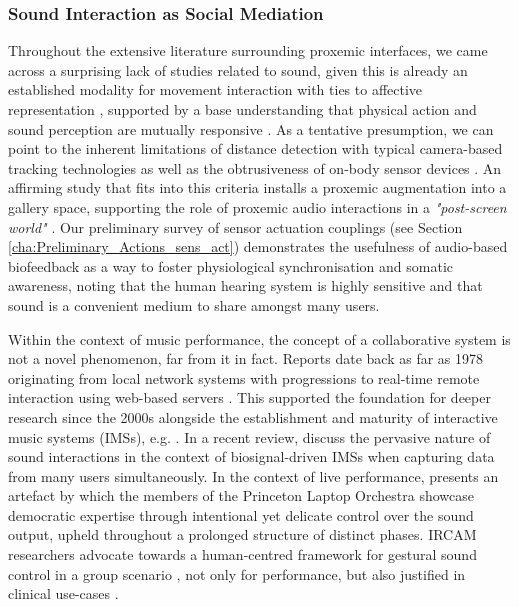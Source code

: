 \subsubsection{Sound Interaction as Social Mediation}
\label{subsec:soundInteraction}

Throughout the extensive literature surrounding proxemic interfaces, we came across a surprising lack of studies related to sound, given this is already an established modality for movement interaction with ties to affective representation \citep{landry_interactive_2020}, supported by a base understanding that physical action and sound perception are mutually responsive \citep{krzyzaniak_six_2019}. As a tentative presumption, we can point to the inherent limitations of distance detection with typical camera-based tracking technologies \citep{wu_out_2017} as well as the obtrusiveness of on-body sensor devices \citep{hensel_defining_2006}. An affirming study that fits into this criteria \citep{rector_eyes-free_2017} installs a proxemic augmentation into a gallery space, supporting the role of proxemic audio interactions in a \textit{"post-screen world"} \citep{bryan-kinns_interaction_2017}. Our preliminary survey of sensor actuation couplings (see Section \ref{cha:Preliminary_Actions_sens_act}) demonstrates the usefulness of audio-based biofeedback as a way to foster physiological synchronisation and somatic awareness, noting that the human hearing system is highly sensitive and that sound is a convenient medium to share amongst many users. 


Within the context of music performance, the concept of a collaborative system is not a novel phenomenon, far from it in fact. Reports date back as far as 1978 \citep{bischoff_music_1978} originating from local network systems with progressions to real-time remote interaction using web-based servers \citep{barbosa_displaced_2003}. This supported the foundation for deeper research since the 2000s alongside the establishment and maturity of interactive music systems (IMSs), e.g. \citep{jorda_reactable_2007,freeman_auracle_2005}. In a recent review, \cite{aly_appropriating_2021} discuss the pervasive nature of sound interactions in the context of biosignal-driven IMSs when capturing data from many users simultaneously. In the context of live performance, \citeauthor{hege_spirit_2014} presents an artefact by which the members of the Princeton Laptop Orchestra showcase democratic expertise through intentional yet delicate control over the sound output, upheld throughout a prolonged structure of distinct phases. IRCAM researchers advocate towards a human-centred framework for gestural sound control in a group scenario \citep{schnell_collective_2015}, not only for performance, but also justified in clinical use-cases \citep{bevilacqua_exploring_2018}.


